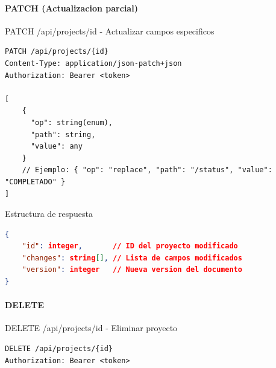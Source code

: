 \documentclass[11pt,a4paper]{article}
\begin{document}
\paragraph{PATCH (Actualizacion parcial)}
\begin{center}
	\begin{minipage}{\textwidth}
		\begin{codebox}{PATCH /api/projects/{id} - Actualizar campos especificos}
			\begin{lstlisting}[language=HTTP]
PATCH /api/projects/{id}
Content-Type: application/json-patch+json
Authorization: Bearer <token>

[
    {
      "op": string(enum),
      "path": string,
      "value": any
    }
    // Ejemplo: { "op": "replace", "path": "/status", "value": "COMPLETADO" }
]
\end{lstlisting}
		\end{codebox}
	\end{minipage}
\end{center}

\begin{center}
	\begin{minipage}{\textwidth}
		\begin{codebox}{Estructura de respuesta}
			\begin{lstlisting}[language=json]
{
    "id": integer,       // ID del proyecto modificado
    "changes": string[], // Lista de campos modificados
    "version": integer   // Nueva version del documento
}
\end{lstlisting}
		\end{codebox}
	\end{minipage}
\end{center}

\paragraph{DELETE}
\begin{center}
	\begin{minipage}{\textwidth}
		\begin{codebox}{DELETE /api/projects/{id} - Eliminar proyecto}
			\begin{lstlisting}[language=HTTP]
DELETE /api/projects/{id}
Authorization: Bearer <token>
\end{lstlisting}
		\end{codebox}
	\end{minipage}
\end{center}
\end{document}
